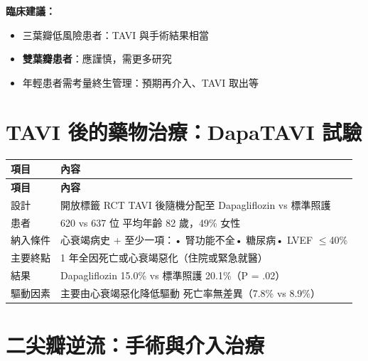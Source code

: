 \documentclass[12pt,a4paper]{article}
\begin{document}
\begin{importantbox}
\textbf{臨床建議：}
\begin{itemize}[noitemsep]
    \item 三葉瓣低風險患者：TAVI 與手術結果相當
    \item \textbf{雙葉瓣患者}：應謹慎，需更多研究
    \item 年輕患者需考量終生管理：預期再介入、TAVI 取出等
\end{itemize}
\end{importantbox}

\section{TAVI 後的藥物治療：DapaTAVI 試驗}

\begin{longtable}{p{4cm}p{10cm}}
\toprule
\textbf{項目} & \textbf{內容} \\
\midrule
\endfirsthead
\midrule
\textbf{項目} & \textbf{內容} \\
\midrule
\endhead
\bottomrule
\endfoot
設計 & 開放標籤 RCT \newline TAVI 後隨機分配至 Dapagliflozin vs 標準照護 \\
\midrule
患者 & 620 vs 637 位 \newline 平均年齡 82 歲，49\% 女性 \\
\midrule
納入條件 & 心衰竭病史 + 至少一項：\newline • 腎功能不全\newline • 糖尿病\newline • LVEF $\leq$40\% \\
\midrule
主要終點 & 1 年全因死亡或心衰竭惡化（住院或緊急就醫）\\
\midrule
結果 & Dapagliflozin 15.0\% vs 標準照護 20.1\%（P = .02）\\
\midrule
驅動因素 & 主要由心衰竭惡化降低驅動 \newline 死亡率無差異（7.8\% vs 8.9\%）\\
\bottomrule
\end{longtable}


\section{二尖瓣逆流：手術與介入治療}
\end{document}
